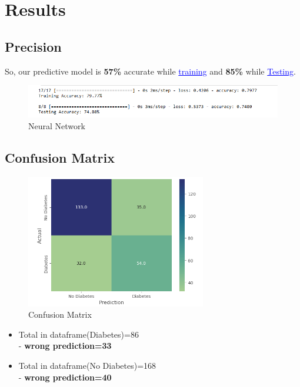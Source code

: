     \newpage
\section{Results}
\label{chap:results}

\subsection{Precision}
\label{sec:Precision}

So, our predictive model is \textbf{57\% } accurate while \textcolor{blue}{\underline{training}} and \textbf{85\% } while \textcolor{blue}{\underline {Testing}}.

\begin{figure}[htp]
    \centering
    \includegraphics[width=1.3\textwidth]{images/accuracy.png}
    \caption{Neural Network }
    \label{fig:example4}
\end{figure}

\subsection{Confusion Matrix}
\label{sec:Confusion Matrix}



\begin{figure}[htp]
    \centering
    \includegraphics[width=0.7\textwidth]{images/confusion.png}
    \caption{Confusion Matrix }
    \label{fig:example5}
\end{figure}

\begin{itemize}
    \item Total in dataframe(Diabetes)=86\\
    - \textbf{wrong prediction=33}
    \item  Total in dataframe(No Diabetes)=168\\
    - \textbf{wrong prediction=40}
\end{itemize}
  

